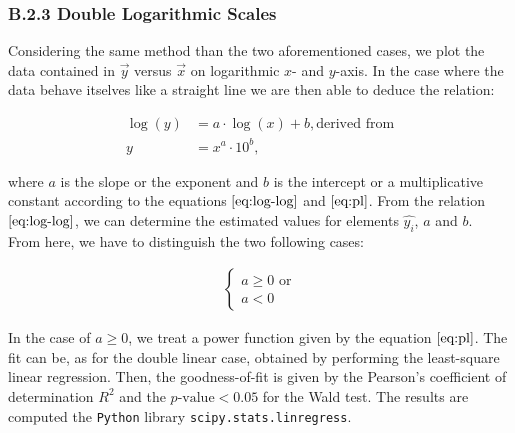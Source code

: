 \documentclass[unnumsec,webpdf,contemporary,large]{oup-authoring-template}%
\theoremstyle{thmstyleone}%
\theoremstyle{thmstyletwo}%
\theoremstyle{thmstylethree}%
\begin{document}
\begin{appendices}
    \subsubsection{B.2.3 Double Logarithmic Scales}
    Considering the same method than the two aforementioned cases, we plot the data contained in $\overrightarrow{y}$ versus $\overrightarrow{x}$ on logarithmic $x$- and $y$-axis. In the case where the data behave itselves like a straight line we are then able to deduce the relation:
    
    \begin{align}
    \log(y) &= a \cdot \log(x) + b, \textrm{derived from} \label{eq:log-log}\\
    y &= x^a \cdot 10^b \label{eq:pl},
    \end{align}
    
    where $a$ is the slope or the exponent and $b$ is the intercept or a multiplicative constant according to the equations $\eqref{eq:log-log}$ and $\eqref{eq:pl}$. From the relation $\eqref{eq:log-log}$, we can determine the estimated values for elements $\hat{y_i}$, $a$ and $b$.\\
    
    From here, we have to distinguish the two following cases:
    
    \begin{align}
    \begin{cases}
    a \geq 0 \textrm{ or}\\
    a < 0
    \end{cases}
    \end{align}
    
    In the case of $a \geq 0$, we treat a power function given by the equation $\eqref{eq:pl}$. The fit can be, as for the double linear case, obtained by performing the least-square linear regression. Then, the goodness-of-fit is given by the Pearson's coefficient of determination $R^2$ and the $p\textrm{-value} < 0.05$ for the Wald test. The results are computed the \verb?Python? library \verb?scipy.stats.linregress?. 
    

\end{appendices}
\end{document}
